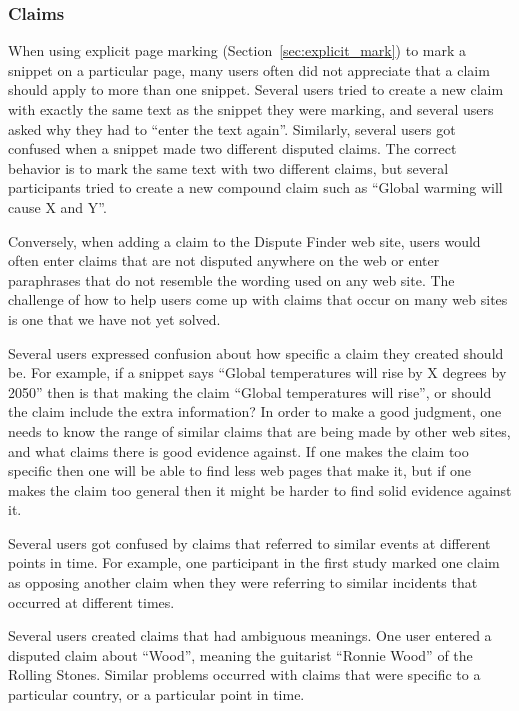 \documentclass{www2010-submission}
\begin{document}
\subsubsection{Claims}

When using explicit page marking (Section~\ref{sec:explicit_mark}) to mark a snippet on a particular page, many users often did not appreciate that a claim should apply to more than one snippet. Several users tried to create a new claim with exactly the same text as the snippet they were marking, and several users asked why they had to ``enter the text again''. Similarly, several users got confused when a snippet made two different disputed claims. The correct behavior is to mark the same text with two different claims, but several participants tried to create a new compound claim such as ``Global warming will cause X and Y''. 

Conversely, when adding a claim to the Dispute Finder web site, users would often enter claims that are not disputed anywhere on the web or enter paraphrases that do not resemble the wording used on any web site. The challenge of how to help users come up with claims that occur on many web sites is one that we have not yet solved.

Several users expressed confusion about how specific a claim they created should be. For example, if a snippet says ``Global temperatures will rise by X degrees by 2050'' then is that making the claim ``Global temperatures will rise'', or should the claim include the extra information? In order to make a good judgment, one needs to know the range of similar claims that are being made by other web sites, and what claims there is good evidence against. If one makes the claim too specific then one will be able to find less web pages that make it, but if one makes the claim too general then it might be harder to find solid evidence against it.

Several users got confused by claims that referred to similar events at different points in time. For example, one participant in the first study marked one claim as opposing another claim when they were referring to similar incidents that occurred at different times. 

Several users created claims that had ambiguous meanings. One user entered a disputed claim about ``Wood'', meaning the guitarist ``Ronnie Wood'' of the Rolling Stones. Similar problems occurred with claims that were specific to a particular country, or a particular point in time. 
\end{document}
